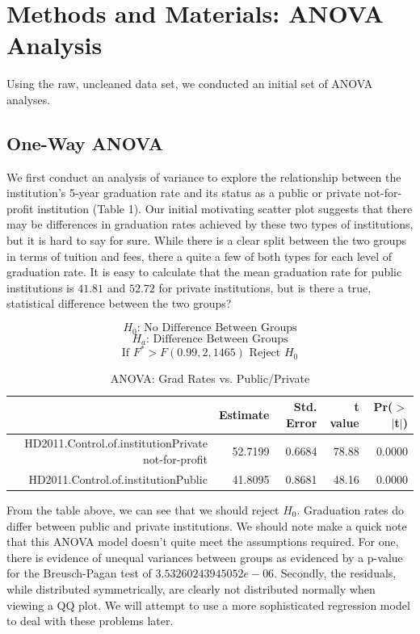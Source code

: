 \documentclass{article}
\begin{document}
\section{Methods and Materials: ANOVA Analysis}

Using the raw, uncleaned data set, we conducted an initial set of ANOVA analyses.

\subsection{One-Way ANOVA}

We first conduct an analysis of variance to explore the relationship between the institution’s 5-year graduation rate and its status as a public or private not-for-profit institution (Table 1). Our initial motivating scatter plot suggests that there may be differences in graduation rates achieved by these two types of institutions, but it is hard to say for sure. While there is a clear split between the two groups in terms of tuition and fees, there a quite a few of both types for each level of graduation rate. It is easy to calculate that the mean graduation rate for public institutions is $41.81$ and $52.72$ for private institutions, but is there a true, statistical difference between the two groups?

$$ H_0\text{: No Difference Between Groups} $$
$$ H_a\text{: Difference Between Groups} $$
$$ \text{If }F^* > F(0.99,2,1465)\text{ Reject }H_0 $$

\begin{table}[ht]
\centering
\begin{tabular}{rrrrr}
  \hline
 & Estimate & Std. Error & t value & Pr($>$$|$t$|$) \\ 
  \hline
HD2011.Control.of.institutionPrivate not-for-profit & 52.7199 & 0.6684 & 78.88 & 0.0000 \\ 
  HD2011.Control.of.institutionPublic & 41.8095 & 0.8681 & 48.16 & 0.0000 \\ 
   \hline
\end{tabular}
\caption{ANOVA: Grad Rates vs. Public/Private} 
\end{table}
\FloatBarrier

From the table above, we can see that we should reject $H_0$. Graduation rates do differ between public and private institutions. We should note make a quick note that this ANOVA model doesn't quite meet the assumptions required. For one, there is evidence of unequal variances between groups as evidenced by a p-value for the Breusch-Pagan test of $3.53260243945052e-06$. Secondly, the residuals, while distributed symmetrically, are clearly not distributed normally when viewing a QQ plot. We will attempt to use a more sophisticated regression model to deal with these problems later.
\end{document}
